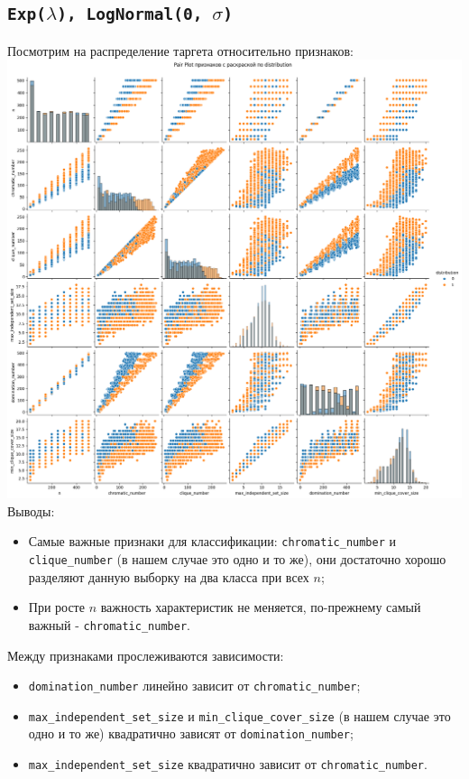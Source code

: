 \documentclass[12pt,a4paper]{report}
\begin{document}
\subsection{\texttt{Exp($\lambda$), LogNormal(0, $\sigma$)}}
Посмотрим на распределение таргета относительно признаков:\\
\includegraphics[width=1\linewidth]{img/dist-exp-lnorm.png}
Выводы:
\begin{itemize}
    \item Самые важные признаки для классификации: \texttt{chromatic\_number} и \texttt{clique\_number} (в нашем случае это одно и то же), они достаточно хорошо разделяют данную выборку на два класса при всех $n$;
    \item При росте $n$ важность характеристик не меняется, по-прежнему самый важный - \texttt{chromatic\_number}.
\end{itemize}
Между признаками прослеживаются зависимости:
\begin{itemize}
    \item \texttt{domination\_number} линейно зависит от \texttt{chromatic\_number};
    \item \texttt{max\_independent\_set\_size} и \texttt{min\_clique\_cover\_size} (в нашем случае это одно и то же) квадратично зависят от \texttt{domination\_number};
    \item \texttt{max\_independent\_set\_size} квадратично зависит от \texttt{chromatic\_number}.
\end{itemize}
\end{document}
